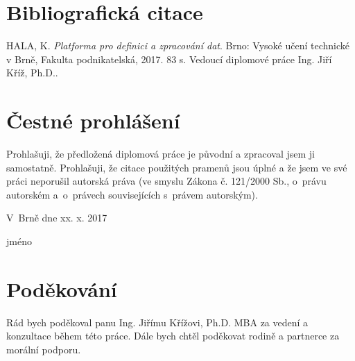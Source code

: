 \documentclass[12pt,oneside,a4paper]{report}
\newcommand{\blank}[1]{\hspace*{#1}}
\begin{document}
\newpage
\hbox{}
\vfill

\section*{Bibliografická citace}
HALA, K. \textit{Platforma pro definici a zpracování dat}. Brno: Vysoké učení technické v Brně, Fakulta podnikatelská, 2017. 83 s. Vedoucí diplomové práce Ing. Jiří Kříž, Ph.D..
\vskip1cm

\newpage
\hbox{}
\vfill

\section*{Čestné prohlášení}
Prohlašuji, že předložená diplomová práce je původní a zpracoval jsem ji samostatně. Prohlašuji, že citace použitých pramenů jsou úplné a že jsem ve své práci neporušil autorská práva (ve smyslu Zákona č. 121/2000 Sb., o~právu autorském a~o~právech souvisejících s~právem autorským).
\\
\par V~Brně dne xx. x. 2017 %
\hfill\dotuline{\blank{5cm}}\hskip2cm
\par\hfill jméno \hskip5cm\blank{-4cm}
\vskip1cm

\newpage
\hbox{}
\vfill

\section*{Poděkování}
Rád bych poděkoval panu Ing. Jiřímu Křížovi, Ph.D. MBA za vedení a konzultace během této práce. Dále bych chtěl poděkovat rodině a partnerce za morální podporu.
\vskip1cm
\end{document}
